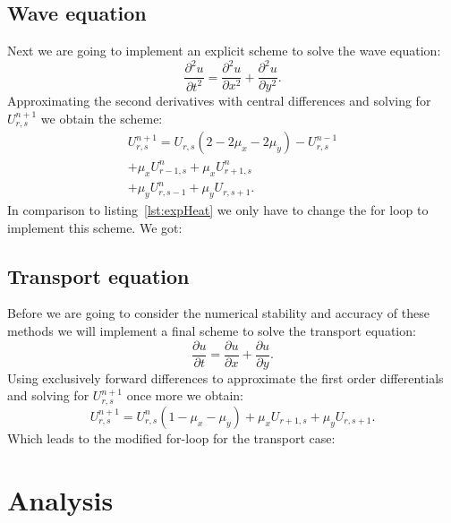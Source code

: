 \documentclass[ twoside,openright,titlepage,numbers=noenddot,headinclude,%
                footinclude=true,cleardoublepage=empty,abstractoff, %
                BCOR=5mm,paper=a4,fontsize=11pt,%
                ngerman,american,%
                ]{scrreprt}
\begin{document}
\section{Wave equation}
Next we are going to implement an explicit scheme to solve the wave equation:
\begin{equation}
\frac{\partial^2 u}{\partial t^2} = \frac{\partial^2 u}{\partial x^2} + \frac{\partial^2 u}{\partial y^2}.
\end{equation}
Approximating the second derivatives with central differences and solving for $U_{r,s}^{n+1}$ we obtain the scheme:
\begin{align*}
U_{r,s}^{n+1} = U_{r,s}(2 - 2\mu_x - 2 \mu_y) - U_{r,s}^{n-1} \\
				 + \mu_x U_{r-1,s}^n + \mu_x U_{r+1,s}^n	  \\
				 + \mu_y U_{r,s-1}^n + \mu_y U_{r,s+1}.
\end{align*}
In comparison to listing~\ref{lst:expHeat} we only have to change the for loop to implement this scheme. We got:




\section{Transport equation}
Before we are going to consider the numerical stability and accuracy of these methods we will implement a final scheme to solve the transport equation:
\begin{equation}
\frac{\partial u}{\partial t} = \frac{\partial u}{\partial x} + \frac{\partial u}{\partial y}.
\end{equation} 
Using exclusively forward differences to approximate the first order differentials and solving for $U_{r,s}^{n+1}$ once more we obtain:
\begin{equation}
U_{r,s}^{n+1} = U_{r,s}^n (1 - \mu_x - \mu_y) + \mu_x U_{r+1,s} + \mu_y U_{r,s+1}.
\end{equation}
Which leads to the modified for-loop for the transport case:



\chapter{Analysis}
\end{document}
